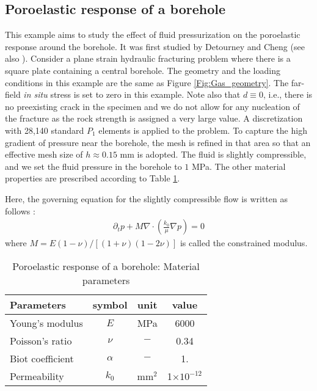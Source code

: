 \subsection{Poroelastic response of a borehole}
This example  aims to study the effect of fluid pressurization on the poroelastic response around the borehole.
It was first studied by {Detourney and Cheng} \cite{detournay1988poroelastic} (see also \cite{wang2018influence, lu2013microcrack}). Consider a plane strain hydraulic fracturing problem where there is a square plate containing a central borehole. The geometry and the loading conditions in this example are the same as Figure \ref{Fig:Gas_geometry}. The far-field \emph{in situ} stress is set to zero in this example. Note also that $d\equiv0$, i.e., there is no preexisting crack in the specimen and we do not allow for any nucleation of the fracture as the rock strength is assigned a very large value. A discretization with 28,140 standard $P_1$ elements is applied to the problem. To capture the high gradient of pressure near the borehole, the mesh is refined in that area so that an effective mesh size of $h\approx 0.15$ mm is adopted. The fluid is slightly compressible, and we set the fluid pressure in the borehole to $1$ MPa. The other material properties are prescribed according to Table \ref{Tab:Borehole_input}.

Here, the governing equation for the slightly compressible flow is written as follows \cite{detournay1988poroelastic}:
\begin{equation*}%
   \begin{aligned}
        \partial_t p+ M \nabla \cdot \left(\frac{k_0}{\mu} \nabla p\right)=0
    \end{aligned}
\end{equation*}
where $M=E\left( 1-\nu\right) /[\left(1+\nu \right)\left(1-2\nu \right)]$ is called the constrained modulus.
\begin{table}[htbp]
    \centering
    \caption{Poroelastic response of a borehole: Material parameters}
    \begin{tabular}{l c c c}
    \hline 
         Parameters & symbol & unit& value \\
    \hline 
         Young's modulus & $E$ &MPa&  6000\\
         Poisson's ratio & $\nu$ &$-$&  0.34\\
         Biot coefficient & $\alpha$ &$-$&  1.\\
         Permeability & $k_0$ &mm$^2$&  1$\times 10^{-12}$\\
            \hline      
    \end{tabular}
    \label{Tab:Borehole_input}
\end{table}

